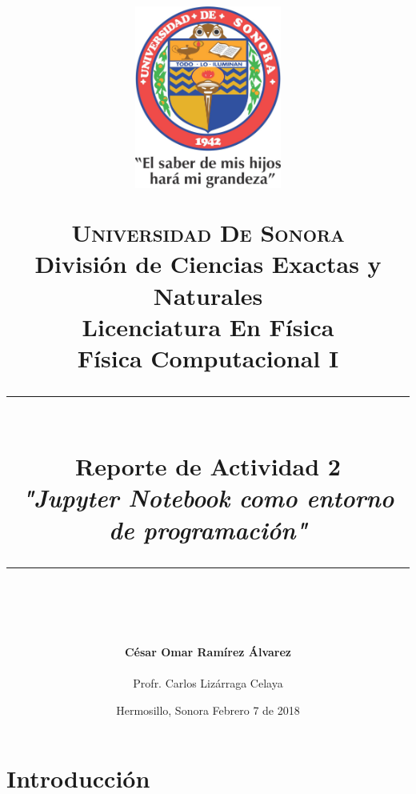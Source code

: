 \documentclass[12pt]{article}
\newcommand{\HRule}[1]{\rule{\linewidth}{#1}}
\begin{document}
\begin{titlepage}

\title{ \normalsize 
        \begin{center}
        \includegraphics[height=6cm]{Logo.jpg}
        \end{center}
        \LARGE \textsc{\textbf{Universidad De Sonora}} \\ \bigskip
		\Large División de Ciencias Exactas y Naturales \\
        Licenciatura En Física \\ \bigskip
        \bigskip
        Física Computacional I
		\\ [0.1cm]  
		\HRule{2pt} \\
		\Large \textbf{{Reporte de Actividad 2}} \\
        \textit{\textbf{"Jupyter Notebook como entorno de programación"}}
		\HRule{2pt} \\
		\normalsize \vspace*{0.001\baselineskip}}
        
\date{\bigskip \Large Hermosillo, Sonora  \hspace*{\fill}  Febrero 7 de 2018}

        
\author{
		\Large\textbf{ César Omar Ramírez Álvarez} \\ \bigskip
        \\ \bigskip
       \Large Profr. Carlos Lizárraga Celaya}
       \end{titlepage}
       \maketitle
       

\newpage
\pagestyle{plain}

\section{Introducción}
\end{document}
